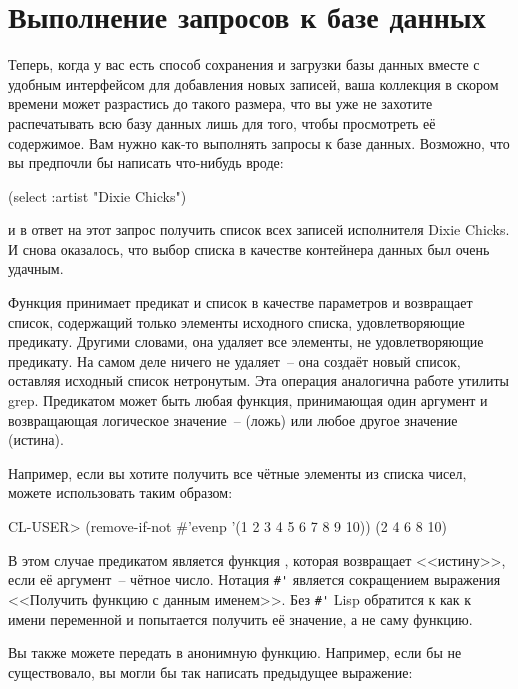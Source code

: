 \section{Выполнение запросов к базе данных}

Теперь, когда у вас есть способ сохранения и загрузки базы данных вместе с удобным
интерфейсом для добавления новых записей, ваша коллекция в скором времени может разрастись
до такого размера, что вы уже не захотите распечатывать всю базу данных лишь для того,
чтобы просмотреть её содержимое. Вам нужно как-то выполнять запросы к базе
данных. Возможно, что вы предпочли бы написать что-нибудь вроде:

\begin{myverb}
  (select :artist "Dixie Chicks")
\end{myverb}

\noindent{}и в ответ на этот запрос получить список всех записей исполнителя Dixie Chicks. И снова
оказалось, что выбор списка в качестве контейнера данных был очень удачным.

Функция  принимает предикат и список в качестве параметров и
возвращает список, содержащий только элементы исходного списка, удовлетворяющие
предикату. Другими словами, она удаляет все элементы, не удовлетворяющие предикату. На
самом деле  ничего не удаляет~-- она создаёт новый список, оставляя
исходный список нетронутым. Эта операция аналогична работе утилиты grep. Предикатом может
быть любая функция, принимающая один аргумент и возвращающая логическое значение~--
 (ложь) или любое другое значение (истина).

Например, если вы хотите получить все чётные элементы из списка чисел, можете использовать
 таким образом:

\begin{myverb}
  CL-USER> (remove-if-not #'evenp '(1 2 3 4 5 6 7 8 9 10))
  (2 4 6 8 10)
\end{myverb}

В этом случае предикатом является функция , которая возвращает <<истину>>,
если её аргумент~-- чётное число. Нотация \lstinline!#'! является сокращением выражения
<<Получить функцию с данным именем>>. Без \lstinline!#'! Lisp обратится к  как к
имени переменной и попытается получить её значение, а не саму функцию.

Вы также можете передать в  анонимную функцию. Например, если бы
 не существовало, вы могли бы так написать предыдущее выражение:

